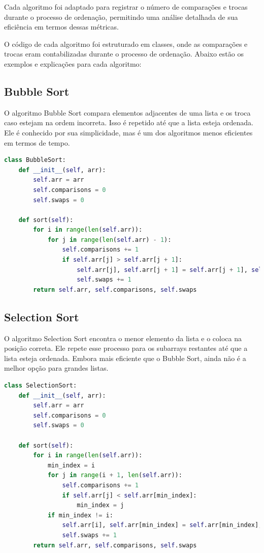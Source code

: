 \documentclass[tcc1,project]{uftex}
\begin{document}
Cada algoritmo foi adaptado para registrar o número de comparações e trocas durante o processo de ordenação, permitindo uma análise detalhada de sua eficiência em termos dessas métricas.

O código de cada algoritmo foi estruturado em classes, onde as comparações e trocas eram contabilizadas durante o processo de ordenação. Abaixo estão os exemplos e explicações para cada algoritmo:

\subsection{Bubble Sort}
O algoritmo Bubble Sort compara elementos adjacentes de uma lista e os troca caso estejam na ordem incorreta. Isso é repetido até que a lista esteja ordenada. Ele é conhecido por sua simplicidade, mas é um dos algoritmos menos eficientes em termos de tempo.

\begin{lstlisting}[language=Python, caption=BubbleSort]
class BubbleSort:
    def __init__(self, arr):
        self.arr = arr
        self.comparisons = 0
        self.swaps = 0

    def sort(self):
        for i in range(len(self.arr)):
            for j in range(len(self.arr) - 1):
                self.comparisons += 1
                if self.arr[j] > self.arr[j + 1]:
                    self.arr[j], self.arr[j + 1] = self.arr[j + 1], self.arr[j]
                    self.swaps += 1
        return self.arr, self.comparisons, self.swaps
\end{lstlisting}

\subsection{Selection Sort}
O algoritmo Selection Sort encontra o menor elemento da lista e o coloca na posição correta. Ele repete esse processo para os subarrays restantes até que a lista esteja ordenada. Embora mais eficiente que o Bubble Sort, ainda não é a melhor opção para grandes listas.

\begin{lstlisting}[language=Python, caption=SelectionSort]
class SelectionSort:
    def __init__(self, arr):
        self.arr = arr
        self.comparisons = 0
        self.swaps = 0
    
    def sort(self):
        for i in range(len(self.arr)):
            min_index = i
            for j in range(i + 1, len(self.arr)):
                self.comparisons += 1
                if self.arr[j] < self.arr[min_index]:
                    min_index = j
            if min_index != i:
                self.arr[i], self.arr[min_index] = self.arr[min_index], self.arr[i]
                self.swaps += 1
        return self.arr, self.comparisons, self.swaps
\end{lstlisting}
\end{document}
